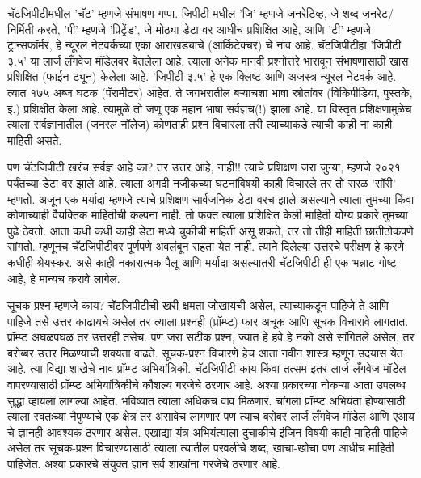 चॅटजिपीटीमधील 'चॅट' म्हणजे संभाषण-गप्पा. जिपीटी मधील 'जि' म्हणजे जनरेटिव्ह, जे शब्द जनरेट/निर्मिती करते, 'पी' म्हणजे 'प्रिट्रेंड', जे मोठ्या डेटा वर आधीच प्रशिक्षित आहे, आणि 'टी' म्हणजे ट्रान्सफॉर्मर, हे न्यूरल नेटवर्कच्या एका आराखड्याचे (आर्किटेक्चर) चे नाव आहे. चॅटजिपीटीहा 'जिपीटी ३.५' या लार्ज लँगवेज मॉडेलवर बेतलेला आहे. त्याला अनेक मानवी प्रश्नोत्तरे भारावून संभाषणासाठी खास प्रशिक्षित (फाईन ट्यून) केलेला आहे. 'जिपीटी ३.५' हे एक क्लिष्ट आणि अजस्त्र न्यूरल नेटवर्क आहे. त्यात १७५ अब्ज घटक (पॅरामीटर) आहेत. ते जगभरातील बऱ्याचशा भाषा स्रोतांवर (विकिपीडिया, पुस्तके, इ.) प्रशिक्षीत केला आहे. त्यामुळे तो जणू एक महान भाषा सर्वज्ञच(!) झाला आहे. या विस्तृत प्रशिक्षणामुळेच त्याला सर्वज्ञानातील (जनरल नॉलेज) कोणताही प्रश्न विचारला तरी त्याच्याकडे त्याची काही ना काही माहिती असते.

पण चॅटजिपीटी खरंच सर्वज्ञ आहे का? तर उत्तर आहे, नाही!! त्याचे प्रशिक्षण जरा जुन्या, म्हणजे २०२१ पर्यंतच्या डेटा वर झाले आहे. त्याला अगदी नजीकच्या घटनांविषयी काही विचारले तर तो सरळ 'सॉरी' म्हणतो. अजून एक मर्यादा म्हणजे त्याचे प्रशिक्षण सार्वजनिक डेटा वरच झाले असल्याने त्याला तुमच्या किंवा कोणाच्याही वैयक्तिक माहितीची कल्पना नाही. तो फक्त त्याला प्रशिक्षित केली माहिती योग्य प्रकारे तुमच्या पुढे ठेवतो. आता कधी कधी काही डेटा मध्ये चुकीची माहिती असू शकते, तर तो तीही माहिती छातीठोकपणे सांगतो. म्हणूनच चॅटजिपीटीवर पूर्णपणे अवलंबून राहता येत नाही. त्याने दिलेल्या उत्तरचे परीक्षण हे करणे कधीही श्रेयस्कर. असे काही नकारात्मक पैलू आणि मर्यादा असल्यातरी चॅटजिपीटी ही एक भन्नाट गोष्ट आहे, हे मान्यच करावे लागेल.

सूचक-प्रश्न म्हणजे काय?
चॅटजिपीटीची खरी क्षमता जोखायची असेल, त्याच्याकडून पाहिजे ते आणि पाहिजे तसे उत्तर काढायचे असेल तर त्याला प्रश्नही (प्रॉम्प्ट) फार अचूक आणि सूचक विचारावे लागतात. प्रॉम्प्ट अघळपघळ तर उत्तरही तसेच. पण जरा सटीक प्रश्न, ज्यात हे हवे हे नको असे सांगितले असेल, तर बरोब्बर उत्तर मिळण्याची शक्यता वाढते. सूचक-प्रश्न विचारणे हेच आता नवीन शास्त्र म्हणून उदयास येत आहे. त्या विद्या-शाखेचे नाव प्रॉम्प्ट अभियांत्रिकी. चॅटजिपीटी काय किंवा तत्सम इतर लार्ज लँगवेज मॉडेल वापरण्यासाठी प्रॉम्प्ट अभियांत्रिकीचे कौशल्य गरजेचे ठरणार आहे. अश्या प्रकारच्या नोकऱ्या आता उपलब्ध सुद्धा व्हायला लागल्या आहेत. भविष्यात त्याला अधिकच वाव मिळणार. चांगला प्रॉम्प्ट अभियंता होण्यासाठी त्याला स्वतःच्या नैपुण्याचे एक क्षेत्र तर असावेच लागणार पण त्याच बरोबर लार्ज लँगवेज मॉडेल आणि एआय चे ज्ञानही आवश्यक ठरणार असेल. एखाद्या यंत्र अभियंत्याला दुचाकीचे इंजिन विषयी काही माहिती पाहिजे असेल तर सूचक-प्रश्न विचारण्यासाठी त्याला त्यातील परवलीचे शब्द, खाचा-खोचा पण आधीच माहिती पाहिजेत. अश्या प्रकारचे संयुक्त ज्ञान सर्व शाखांना गरजेचे ठरणार आहे.

